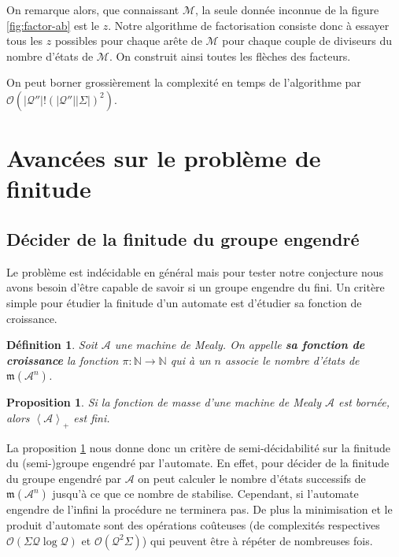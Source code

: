 \documentclass[11pt,a4paper]{article}
\newtheorem{prop}{Proposition}
\newtheorem{definition}{Définition}
\begin{document}
On remarque alors, que connaissant $\mathcal{M}$, la seule donnée inconnue de la figure \ref{fig:factor-ab} est le $z$. Notre algorithme de factorisation consiste donc à essayer tous les $z$ possibles pour chaque arête de $\mathcal{M}$ pour chaque couple de diviseurs du nombre d'états de $\mathcal{M}$. On construit ainsi toutes les flèches des facteurs.

On peut borner grossièrement la complexité en temps de l'algorithme par $\mathcal{O}(|\mathcal{Q''}|!\left(|\mathcal{Q''}||\Sigma|\right)^2)$.

\section{Avancées sur le problème de finitude\label{sec:finitude}}

\subsection{Décider de la finitude du groupe engendré}

Le problème est indécidable en général mais pour tester notre conjecture nous avons besoin d'être capable de savoir si un groupe engendre du fini. Un critère simple pour étudier la finitude d'un automate est d'étudier sa fonction de croissance.

\begin{definition}
  Soit $\mathcal{A}$ une machine de Mealy. On appelle \textbf{\textit{sa fonction de croissance}} la fonction $\pi:\mathbb{N}\rightarrow\mathbb{N}$ qui à un $n$ associe le nombre d'états de $\mathfrak{m}\left(\mathcal{A}^n\right)$.
\end{definition}

\begin{prop}
  \label{prop:mass}
  Si la fonction de masse d'une machine de Mealy $\mathcal{A}$ est bornée, alors $\left<\mathcal{A}\right>_+$ est fini.
\end{prop}

La proposition \ref{prop:mass} nous donne donc un critère de semi-décidabilité sur la finitude du (semi-)groupe engendré par l'automate. En effet, pour décider de la finitude du groupe engendré par $\mathcal{A}$ on peut calculer le nombre d'états successifs de $\mathfrak{m}\left(\mathcal{A}^n\right)$ jusqu'à ce que ce nombre de stabilise. Cependant, si l'automate engendre de l'infini la procédure ne terminera pas. De plus la minimisation et le produit d'automate sont des opérations coûteuses (de complexités respectives $\mathcal{O}\left(\Sigma\mathcal{Q}\log\mathcal{Q}\right)$ et $\mathcal{O}\left(\mathcal{Q}^2\Sigma\right)$) qui peuvent être à répéter de nombreuses fois.
\end{document}
